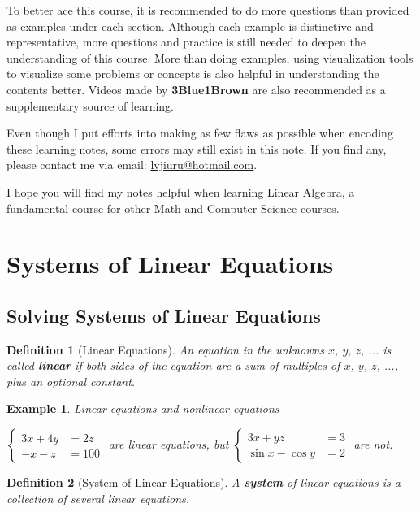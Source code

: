 \documentclass[12pt, a4paper]{article}
\newtheorem{df}{Definition}[subsection]
\newtheorem{eg}{Example}[subsection]
\begin{document}
To better ace this course, it is recommended to do more questions than provided as examples under each section. Although each example is distinctive and representative, more questions and practice is still needed to deepen the understanding of this course. More than doing examples, using visualization tools to visualize some problems or concepts is also helpful in understanding the contents better. Videos made by \textbf{3Blue1Brown} are also recommended as a supplementary source of learning. 

Even though I put efforts into making as few flaws as possible when encoding these learning notes, some errors may still exist in this note. If you find any, please contact me via email: \url{lvjiuru@hotmail.com}. 

I hope you will find my notes helpful when learning Linear Algebra, a fundamental course for other Math and Computer Science courses. 


\newpage
\section{Systems of Linear Equations}
\subsection{Solving Systems of Linear Equations}

\begin{df}[Linear Equations]
An equation in the unknowns $x$, $y$, $z$, ... is called \textbf{linear} if both sides of the equation are a sum of multiples of $x$, $y$, $z$, ..., plus an optional constant. 
\end{df}
\begin{eg}
Linear equations and nonlinear equations\par
\begin{center}
$\left\{\begin{aligned}3x+4y&=2z\\-x-z&=100\end{aligned}\right.$ are linear equations,  but $\left\{\begin{aligned}3x+yz&=3\\\sin x-\cos y&=2\end{aligned}\right.$ are not.
\end{center}
\end{eg}

\begin{df}[System of Linear Equations]
A \textbf{system} of linear equations is a collection of several linear equations.
\end{df}
\end{document}
